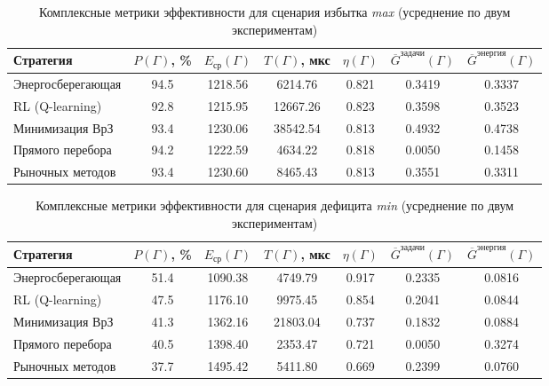\begin{table}[h!]
	\centering
	\caption{Комплексные метрики эффективности для сценария избытка \textit{max} (усреднение по двум экспериментам)}
	\label{tab:complex_max}
	\small
	\begin{tabular}{|l|c|c|c|c|c|c|}
		\hline
		\textbf{Стратегия} & $P(\Gamma)$, \% & $E_{\text{ср}}(\Gamma)$ & $T(\Gamma)$, мкс & $\eta(\Gamma)$ & $\overline{G}^{\text{задачи}}(\Gamma)$ & $\overline{G}^{\text{энергия}}(\Gamma)$ \\ \hline
		Энергосберегающая & 94.5 & 1218.56 &  6214.76 & 0.821 & 0.3419 & 0.3337 \\ \hline
		RL (Q-learning)    & 92.8 & 1215.95 & 12667.26 & 0.823 & 0.3598 & 0.3523 \\ \hline
		Минимизация ВрЗ    & 93.4 & 1230.06 & 38542.54 & 0.813 & 0.4932 & 0.4738 \\ \hline
		Прямого перебора   & 94.2 & 1222.59 &  4634.22 & 0.818 & 0.0050 & 0.1458 \\ \hline
		Рыночных методов   & 93.4 & 1230.60 &  8465.43 & 0.813 & 0.3551 & 0.3311 \\ \hline
	\end{tabular}
\end{table}

\begin{table}[h!]
	\centering
	\caption{Комплексные метрики эффективности для сценария дефицита \textit{min} (усреднение по двум экспериментам)}
	\label{tab:complex_min}
	\small
	\begin{tabular}{|l|c|c|c|c|c|c|}
		\hline
		\textbf{Стратегия} & $P(\Gamma)$, \% & $E_{\text{ср}}(\Gamma)$ & $T(\Gamma)$, мкс & $\eta(\Gamma)$ & $\overline{G}^{\text{задачи}}(\Gamma)$ & $\overline{G}^{\text{энергия}}(\Gamma)$ \\ \hline
		Энергосберегающая & 51.4 & 1090.38 &  4749.79 & 0.917 & 0.2335 & 0.0816 \\ \hline
		RL (Q-learning)    & 47.5 & 1176.10 &  9975.45 & 0.854 & 0.2041 & 0.0844 \\ \hline
		Минимизация ВрЗ    & 41.3 & 1362.16 & 21803.04 & 0.737 & 0.1832 & 0.0884 \\ \hline
		Прямого перебора   & 40.5 & 1398.40 &  2353.47 & 0.721 & 0.0050 & 0.3274 \\ \hline
		Рыночных методов   & 37.7 & 1495.42 &  5411.80 & 0.669 & 0.2399 & 0.0760 \\ \hline
	\end{tabular}
\end{table}

